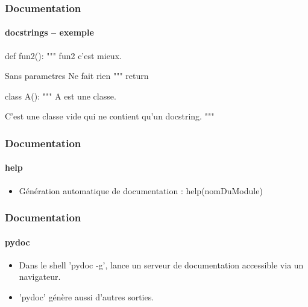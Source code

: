 \begin{frame}[fragile]
\frametitle{Documentation}
\framesubtitle{docstrings -- exemple}
\begin{python}
def fun2(): 
    """
    fun2 c'est mieux. 
    
    Sans parametres
    Ne fait rien
    """
    return

class A(): 
    """
    A est une classe. 
   
    C'est une classe vide qui ne contient qu'un docstring.
    """

\end{python}
\end{frame}
\begin{frame}
\frametitle{Documentation}
\framesubtitle{help}
\begin{minipage}[c]{3cm}
\begin{itemize}
 \item Génération automatique de documentation : help(nomDuModule)
\end{itemize}
\end{minipage}
\hfill%
\begin{minipage}[c]{6cm}
\begin{center}
\end{center}
\end{minipage}
\end{frame}
\begin{frame}
\frametitle{Documentation}
\framesubtitle{pydoc}
\begin{minipage}[c]{4cm}
\begin{itemize}
\item Dans le shell 'pydoc -g', lance un serveur de documentation accessible via un navigateur. 
\item 'pydoc' génère aussi d'autres sorties. 
\end{itemize}
\end{minipage}
\hfill%
\begin{minipage}[c]{6cm}
\begin{center}
\end{center}
\end{minipage}
\end{frame}
